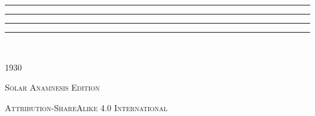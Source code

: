 \documentclass{article}
\begin{document}
\begin{titlepage} %
	\centering %


	\rule{\textwidth}{1.6pt}\vspace*{-\baselineskip}\vspace*{2pt} %
	\rule{\textwidth}{0.4pt} %
	
	\vspace{1\baselineskip} %
	
	{\scshape\Huge {}}
	
	\vspace{1\baselineskip} %

	\rule{\textwidth}{0.4pt}\vspace*{-\baselineskip}\vspace{3.2pt} %
	\rule{\textwidth}{1.6pt} %
	
	\vspace{1\baselineskip} %
	
	
        {\large {}}
 
        \vspace{1.0\baselineskip}
‌
        \vspace*{\fill}    

        \vspace{1.0\baselineskip}

        { }
        
	\vspace{1\baselineskip}

        {\small{} 1930}
		
	\vspace{0.25\baselineskip} %

        {\scshape\small Solar Anamnesis Edition}%
    
	{\scshape\footnotesize Attribution-ShareAlike 4.0 International } %
\end{titlepage}
\clearpage
\tableofcontents
\clearpage
\large
\end{document}
